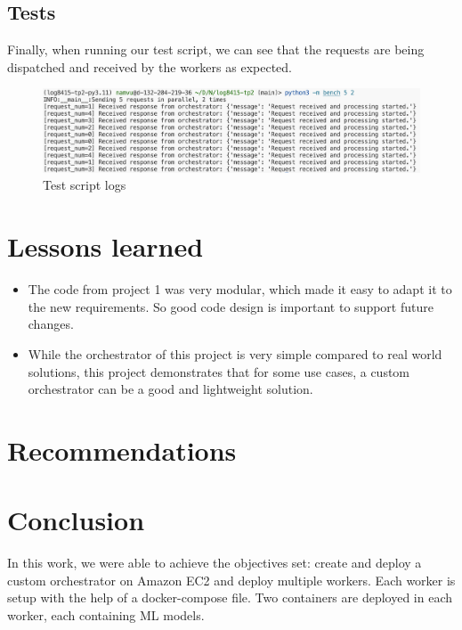 \documentclass[letterpaper,headings=standardclasses,parskip=half]{scrartcl}
\newcommand{\todo}{{\color{red}{TODO}}}
\begin{document}
\subsection{Tests}

Finally, when running our test script, we can see that the requests are being dispatched and received by the workers as expected.

\begin{figure}[H]
    \centering
    \includegraphics[width=\textwidth]{images/test.png}
    \caption{Test script logs}
    \label{fig:test}
\end{figure}

\section{Lessons learned}

\begin{itemize}
    \item The code from project 1 was very modular, which made it easy to adapt it to the new requirements. So good code design is important to support future changes.
    \item While the orchestrator of this project is very simple compared to real world solutions, this project demonstrates that for some use cases, a custom orchestrator can be a good and lightweight solution.
\end{itemize}

\section{Recommendations}

\todo

\section{Conclusion}

In this work, we were able to achieve the objectives set: create and deploy a custom orchestrator on Amazon EC2 and deploy multiple workers. Each worker is setup with the help of a docker-compose file. Two containers are deployed in each worker, each containing ML models.
\end{document}
